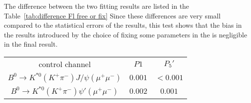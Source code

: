The difference between the two fitting results are listed in the Table~\ref{tab:difference Fl free or fix}
Since these differences are very small compared to the statistical errors of the results, this test shows that the bias in the results introduced by the choice of fixing some parameters in the \pdf is negligible in the final result.

\begin{table*}[!htb]
  \begin {center}
    \begin{small}
      \caption{Validation of the two control channels with $F_L$ free or fix.
        \label{tab:difference Fl free or fix}}
      \begin{tabular}{c|c|c}
        \hline
        control channel & $P1$ & $P_5'$ \\
        {$B^0 \rightarrow K^{*0}(K^+\pi^-) J/\psi(\mu^+ \mu^-)$} & $0.001$ & $<0.001$ \\
        \hline
        {$B^0 \rightarrow K^{*0}(K^+\pi^-) \psi'(\mu^+ \mu^-)$}  & $0.002$ & $0.001$  \\
      \end{tabular}
    \end{small}
  \end{center}
\end{table*}
